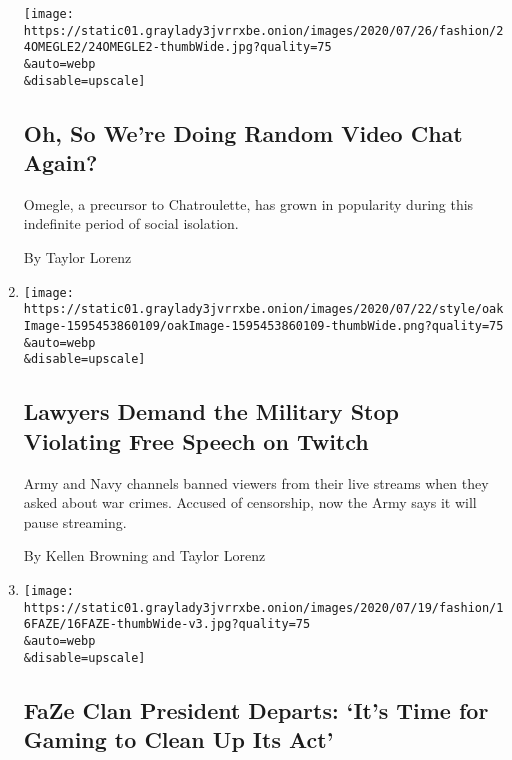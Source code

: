 \begin{enumerate}
  \texttt{[image: https://static01.graylady3jvrrxbe.onion/images/2020/07/26/fashion/24OMEGLE2/24OMEGLE2-thumbWide.jpg?quality=75\\\&auto=webp\\\&disable=upscale]}

  \hypertarget{oh-so-were-doing-random-video-chat-again}{%
  \subsection{Oh, So We're Doing Random Video Chat
  Again?}\label{oh-so-were-doing-random-video-chat-again}}

  Omegle, a precursor to Chatroulette, has grown in popularity during
  this indefinite period of social isolation.

  By Taylor Lorenz
\item
  \href{/2020/07/22/style/army-gamers-war-crimes-first-amendment.html}{}

  \texttt{[image: https://static01.graylady3jvrrxbe.onion/images/2020/07/22/style/oakImage-1595453860109/oakImage-1595453860109-thumbWide.png?quality=75\\\&auto=webp\\\&disable=upscale]}

  \hypertarget{lawyers-demand-the-military-stop-violating-free-speech-on-twitch}{%
  \subsection{Lawyers Demand the Military Stop Violating Free Speech on
  Twitch}\label{lawyers-demand-the-military-stop-violating-free-speech-on-twitch}}

  Army and Navy channels banned viewers from their live streams when
  they asked about war crimes. Accused of censorship, now the Army says
  it will pause streaming.

  By Kellen Browning and Taylor Lorenz
\item
  \href{/2020/07/16/style/xset-gaming-lifestyle-company-faze-clan.html}{}

  \texttt{[image: https://static01.graylady3jvrrxbe.onion/images/2020/07/19/fashion/16FAZE/16FAZE-thumbWide-v3.jpg?quality=75\\\&auto=webp\\\&disable=upscale]}

  \hypertarget{faze-clan-president-departs-its-time-for-gaming-to-clean-up-its-act}{%
  \subsection{FaZe Clan President Departs: `It's Time for Gaming to
  Clean Up Its
  Act'}\label{faze-clan-president-departs-its-time-for-gaming-to-clean-up-its-act}}


\end{enumerate}
